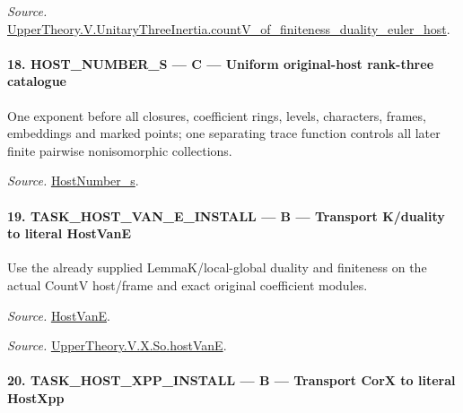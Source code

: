 \documentclass[11pt,a4paper]{article}
\numberwithin{equation}{section}
\theoremstyle{remark}\newtheorem{remark}[theorem]{Remark}
\begin{document}
\emph{Source.} \href{https://github.com/CocoSgt/riemann-hypothesis-lean/blob/7cbf7a0c32fca1badf05931879a37c3f8a2b03b4/src/Development/AutomorphicArithmetic/AutomorphicVarieties/ModularityArgument/ThresholdArguments/DenseThresholdCases/CountVOf.lean#L33-L60}{UpperTheory.V.UnitaryThreeInertia.countV\_\allowbreak of\_\allowbreak finiteness\_\allowbreak duality\_\allowbreak euler\_\allowbreak host}.



\paragraph{18. HOST\_\allowbreak NUMBER\_\allowbreak S — C — Uniform original-host rank-three catalogue}

One exponent before all closures, coefficient rings, levels, characters, frames, embeddings and marked points; one separating trace function controls all later finite pairwise nonisomorphic collections.

\emph{Source.} \href{https://github.com/CocoSgt/riemann-hypothesis-lean/blob/7cbf7a0c32fca1badf05931879a37c3f8a2b03b4/src/Development/AutomorphicArithmetic/AutomorphicVarieties/ModularityArgument/ThresholdArguments/DenseThresholdCases/HostNumberS.lean#L18-L28}{HostNumber\_\allowbreak s}.



\paragraph{19. TASK\_\allowbreak HOST\_\allowbreak VAN\_\allowbreak E\_\allowbreak INSTALL — B — Transport K/duality to literal HostVanE}

Use the already supplied LemmaK/local-global duality and finiteness on the actual CountV host/frame and exact original coefficient modules.

\emph{Source.} \href{https://github.com/CocoSgt/riemann-hypothesis-lean/blob/7cbf7a0c32fca1badf05931879a37c3f8a2b03b4/src/Development/AutomorphicArithmetic/AutomorphicVarieties/UnitaryThreeDeformations/HostNumber.lean#L9-L12}{HostVanE}.

\emph{Source.} \href{https://github.com/CocoSgt/riemann-hypothesis-lean/blob/7cbf7a0c32fca1badf05931879a37c3f8a2b03b4/src/Development/AutomorphicArithmetic/AutomorphicVarieties/LevelCohomology/SoHostVanE.lean#L11-L18}{UpperTheory.V.X.So.hostVanE}.



\paragraph{20. TASK\_\allowbreak HOST\_\allowbreak XPP\_\allowbreak INSTALL — B — Transport CorX to literal HostXpp}
\end{document}
